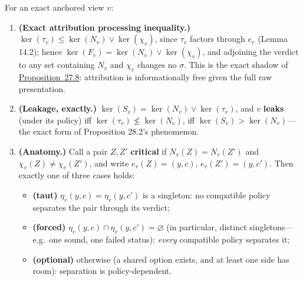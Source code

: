 \begin{thmplain}

For an exact anchored view \(v\):

\begin{enumerate}
\def\labelenumi{\arabic{enumi}.}
\tightlist
\item
  \textbf{(Exact attribution processing inequality.)} \(\ker(\tau_v) \le \ker(N_v) \vee \ker(\chi_v)\), since \(\tau_v\) factors through \(e_v\) (Lemma 14.2); hence \(\ker(F_v) = \ker(N_v) \vee \ker(\chi_v)\), and adjoining the verdict to any set containing \(N_v\) and \(\chi_v\) changes no \(\sigma\). This is the exact shadow of \hyperlink{stmt:27.8}{Proposition~27.8}: attribution is informationally free given the full raw presentation.
\item
  \textbf{(Leakage, exactly.)} \(\ker(S_v) = \ker(N_v) \vee \ker(\tau_v)\), and \(v\) \textbf{leaks} (under its policy) iff \(\ker(\tau_v) \not\le \ker(N_v)\), iff \(\ker(S_v) > \ker(N_v)\)---\hspace{0pt}the exact form of Proposition 28.2's phenomenon.
\item
  \textbf{(Anatomy.)} Call a pair \(Z, Z'\) \textbf{critical} if \(N_v(Z) = N_v(Z')\) and \(\chi_v(Z) \ne \chi_v(Z')\), and write \(e_v(Z) = (y, c)\), \(e_v(Z') = (y, c')\). Then exactly one of three cases holds:

  \begin{itemize}
  \tightlist
  \item
    \textbf{(taut)} \(\eta_v(y,c) = \eta_v(y,c')\) is a singleton: no compatible policy separates the pair through its verdict;
  \item
    \textbf{(forced)} \(\eta_v(y,c) \cap \eta_v(y,c') = \varnothing\) (in particular, distinct singletons---\hspace{0pt}e.g.~one sound, one failed status): \emph{every} compatible policy separates it;
  \item
    \textbf{(optional)} otherwise (a shared option exists, and at least one side has room): separation is policy-dependent.
  \end{itemize}


\end{enumerate}
\end{thmplain}
